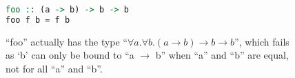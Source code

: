 \begin{figure}
    \centering
    \begin{lstlisting}[language=Haskell]
foo :: (a -> b) -> b -> b
foo f b = f b\end{lstlisting}
    \caption{``foo'' actually has the type ``$\forall a. \forall b. (a\rightarrow b)\rightarrow b\rightarrow b$'', which fails as `b' can only be bound to ``a $\rightarrow$ b'' when ``a'' and ``b'' are equal, not for all ``a'' and ``b''.}
    \label{fig:disjoint}
\end{figure}